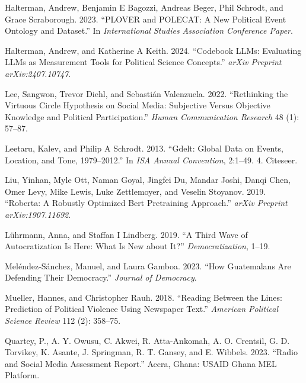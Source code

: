 \documentclass[
  letterpaper,
  DIV=11,
  numbers=noendperiod]{scrartcl}
\newlength{\cslhangindent}
\newlength{\cslentryspacingunit} %
\newenvironment{CSLReferences}[2] %
 {%
  \setlength{\parindent}{0pt}
  \ifodd #1
  \let\oldpar\par
  \def\par{\hangindent=\cslhangindent\oldpar}
  \fi
  \setlength{\parskip}{#2\cslentryspacingunit}
 }%
 {}
\begin{document}
\begin{CSLReferences}{1}{0}
\leavevmode{}%
Halterman, Andrew, Benjamin E Bagozzi, Andreas Beger, Phil Schrodt, and
Grace Scraborough. 2023. {``PLOVER and POLECAT: A New Political Event
Ontology and Dataset.''} In \emph{International Studies Association
Conference Paper}.

\leavevmode{}%
Halterman, Andrew, and Katherine A Keith. 2024. {``Codebook LLMs:
Evaluating LLMs as Measurement Tools for Political Science Concepts.''}
\emph{arXiv Preprint arXiv:2407.10747}.

\leavevmode{}%
Lee, Sangwon, Trevor Diehl, and Sebastián Valenzuela. 2022.
{``Rethinking the Virtuous Circle Hypothesis on Social Media: Subjective
Versus Objective Knowledge and Political Participation.''} \emph{Human
Communication Research} 48 (1): 57--87.

\leavevmode{}%
Leetaru, Kalev, and Philip A Schrodt. 2013. {``Gdelt: Global Data on
Events, Location, and Tone, 1979--2012.''} In \emph{ISA Annual
Convention}, 2:1--49. 4. Citeseer.

\leavevmode{}%
Liu, Yinhan, Myle Ott, Naman Goyal, Jingfei Du, Mandar Joshi, Danqi
Chen, Omer Levy, Mike Lewis, Luke Zettlemoyer, and Veselin Stoyanov.
2019. {``Roberta: A Robustly Optimized Bert Pretraining Approach.''}
\emph{arXiv Preprint arXiv:1907.11692}.

\leavevmode{}%
Lührmann, Anna, and Staffan I Lindberg. 2019. {``A Third Wave of
Autocratization Is Here: What Is New about It?''}
\emph{Democratization}, 1--19.

\leavevmode{}%
Meléndez-Sánchez, Manuel, and Laura Gamboa. 2023. {``How Guatemalans Are
Defending Their Democracy.''} \emph{Journal of Democracy}.

\leavevmode{}%
Mueller, Hannes, and Christopher Rauh. 2018. {``Reading Between the
Lines: Prediction of Political Violence Using Newspaper Text.''}
\emph{American Political Science Review} 112 (2): 358--75.

\leavevmode{}%
Quartey, P., A. Y. Owusu, C. Akwei, R. Atta-Ankomah, A. O. Crentsil, G.
D. Torvikey, K. Asante, J. Springman, R. T. Gansey, and E. Wibbels.
2023. {``Radio and Social Media Assessment Report.''} Accra, Ghana:
USAID Ghana MEL Platform.


\end{CSLReferences}
\end{document}
